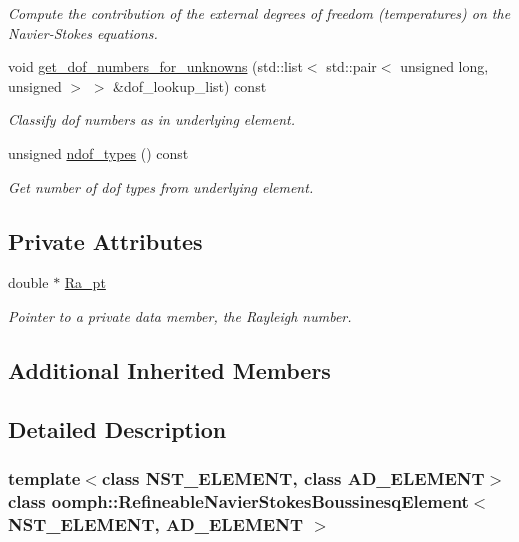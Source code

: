 \begin{DoxyCompactItemize}
\begin{DoxyCompactList}\small\item\em Compute the contribution of the external degrees of freedom (temperatures) on the Navier-\/\+Stokes equations. \end{DoxyCompactList}\item 
void \hyperlink{classoomph_1_1RefineableNavierStokesBoussinesqElement_aab581709145cc3e9a4da5c5417d1c50f}{get\+\_\+dof\+\_\+numbers\+\_\+for\+\_\+unknowns} (std\+::list$<$ std\+::pair$<$ unsigned long, unsigned $>$ $>$ \&dof\+\_\+lookup\+\_\+list) const
\begin{DoxyCompactList}\small\item\em Classify dof numbers as in underlying element. \end{DoxyCompactList}\item 
unsigned \hyperlink{classoomph_1_1RefineableNavierStokesBoussinesqElement_a8e494f3887499d79d8c30c7434494b47}{ndof\+\_\+types} () const
\begin{DoxyCompactList}\small\item\em Get number of dof types from underlying element. \end{DoxyCompactList}\end{DoxyCompactItemize}
\subsection*{Private Attributes}
\begin{DoxyCompactItemize}
\item 
double $\ast$ \hyperlink{classoomph_1_1RefineableNavierStokesBoussinesqElement_a4ea4706d0f735b1986287038191ee4e9}{Ra\+\_\+pt}
\begin{DoxyCompactList}\small\item\em Pointer to a private data member, the Rayleigh number. \end{DoxyCompactList}\end{DoxyCompactItemize}
\subsection*{Additional Inherited Members}


\subsection{Detailed Description}
\subsubsection*{template$<$class N\+S\+T\+\_\+\+E\+L\+E\+M\+E\+NT, class A\+D\+\_\+\+E\+L\+E\+M\+E\+NT$>$\newline
class oomph\+::\+Refineable\+Navier\+Stokes\+Boussinesq\+Element$<$ N\+S\+T\+\_\+\+E\+L\+E\+M\+E\+N\+T, A\+D\+\_\+\+E\+L\+E\+M\+E\+N\+T $>$}


